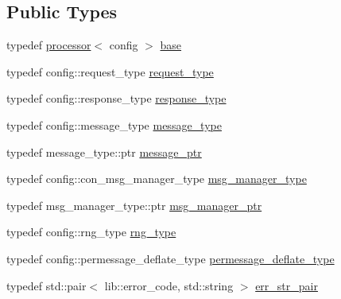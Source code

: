 \subsection*{Public Types}
\begin{DoxyCompactItemize}
\item 
typedef \hyperlink{classwebsocketpp_1_1processor_1_1processor}{processor}$<$ config $>$ \hyperlink{classwebsocketpp_1_1processor_1_1hybi13_a8153dff44df2368d14f2ecd8473ea064}{base}
\item 
typedef config\+::request\+\_\+type \hyperlink{classwebsocketpp_1_1processor_1_1hybi13_aaf7438e06dfb60da29ef201f8c8cf2dd}{request\+\_\+type}
\item 
typedef config\+::response\+\_\+type \hyperlink{classwebsocketpp_1_1processor_1_1hybi13_a5d918ca9c9aa6c38a145f2ef1d2aa38a}{response\+\_\+type}
\item 
typedef config\+::message\+\_\+type \hyperlink{classwebsocketpp_1_1processor_1_1hybi13_a547b5e5f405468b36b9027f0e973fa15}{message\+\_\+type}
\item 
typedef message\+\_\+type\+::ptr \hyperlink{classwebsocketpp_1_1processor_1_1hybi13_a0571e90d7261ab722f695feb7dd48fed}{message\+\_\+ptr}
\item 
typedef config\+::con\+\_\+msg\+\_\+manager\+\_\+type \hyperlink{classwebsocketpp_1_1processor_1_1hybi13_a25a9c3d7a121ae54e064f47a6a7a5931}{msg\+\_\+manager\+\_\+type}
\item 
typedef msg\+\_\+manager\+\_\+type\+::ptr \hyperlink{classwebsocketpp_1_1processor_1_1hybi13_a435c6586650330e0f1685da6b4e70a68}{msg\+\_\+manager\+\_\+ptr}
\item 
typedef config\+::rng\+\_\+type \hyperlink{classwebsocketpp_1_1processor_1_1hybi13_ad6e55eeed8ec7329fb71abceb4159a5c}{rng\+\_\+type}
\item 
typedef config\+::permessage\+\_\+deflate\+\_\+type \hyperlink{classwebsocketpp_1_1processor_1_1hybi13_a9e82fb49b851fa427f409aab42d7b6a9}{permessage\+\_\+deflate\+\_\+type}
\item 
typedef std\+::pair$<$ lib\+::error\+\_\+code, std\+::string $>$ \hyperlink{classwebsocketpp_1_1processor_1_1hybi13_a1ebac644e40640950b65782ccc39a33a}{err\+\_\+str\+\_\+pair}
\end{DoxyCompactItemize}
